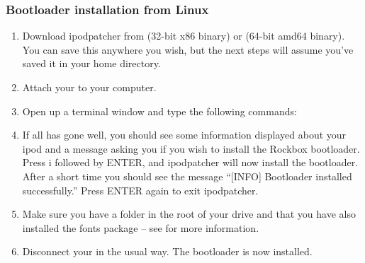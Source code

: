 \subsubsection{Bootloader installation from Linux}

\begin{enumerate}

\item Download ipodpatcher from
 (32-bit x86 
binary) or  
(64-bit amd64 binary). You can save this anywhere you wish, but the next 
steps will assume you've saved it in your home directory.

\item Attach your \dap{} to your computer.

\item Open up a terminal window and type the following commands:



\item If all has gone well, you should see some information displayed about
your ipod and a message asking you if you wish to install the Rockbox
bootloader. Press i followed by ENTER, and ipodpatcher will now install the
bootloader. After a short time you should see the message ``[INFO] Bootloader
installed successfully.'' Press ENTER again to exit ipodpatcher.

\item Make sure you have a  folder in the
root of your \daps{} drive and that you have also installed the fonts
package -- see  for more information.

\item Disconnect your \dap{} in the usual way. The bootloader is now installed.

\end{enumerate}
